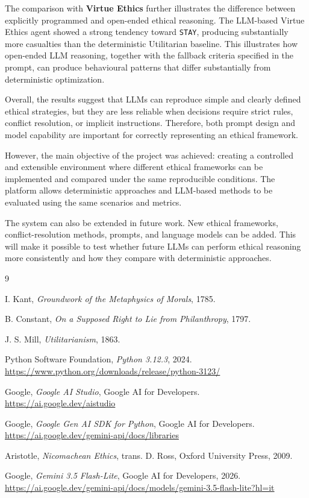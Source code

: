 \documentclass[10pt,a4paper]{article}
\begin{document}
The comparison with \textbf{Virtue Ethics} further illustrates the difference between
explicitly programmed and open-ended ethical reasoning. The LLM-based Virtue
Ethics agent showed a strong tendency toward \texttt{STAY}, producing
substantially more casualties than the deterministic Utilitarian baseline.
This illustrates how open-ended LLM reasoning, together with the fallback
criteria specified in the prompt, can produce behavioural patterns that differ
substantially from deterministic optimization.

Overall, the results suggest that LLMs can reproduce simple and clearly defined ethical strategies, but they are less reliable when decisions require strict rules, conflict resolution, or implicit instructions. Therefore, both prompt design and model capability are important for correctly representing an ethical framework.

However, the main objective of the project was achieved: creating a controlled and extensible environment where different ethical frameworks can be implemented and compared under the same reproducible conditions. The platform allows deterministic approaches and LLM-based methods to be evaluated using the same scenarios and metrics.

The system can also be extended in future work. New ethical frameworks, conflict-resolution methods, prompts, and language models can be added. This will make it possible to test whether future LLMs can perform ethical reasoning more consistently and how they compare with deterministic approaches.





\newpage
\begin{thebibliography}{9}

I. Kant,
\textit{Groundwork of the Metaphysics of Morals},
1785.

B. Constant,
\textit{On a Supposed Right to Lie from Philanthropy},
1797.

J. S. Mill,
\textit{Utilitarianism},
1863.

Python Software Foundation,
\textit{Python 3.12.3},
2024.
\url{https://www.python.org/downloads/release/python-3123/}

Google,
\textit{Google AI Studio},
Google AI for Developers.
\url{https://ai.google.dev/aistudio}

Google,
\textit{Google Gen AI SDK for Python},
Google AI for Developers.
\url{https://ai.google.dev/gemini-api/docs/libraries}

Aristotle,
\textit{Nicomachean Ethics},
trans. D. Ross, Oxford University Press, 2009.

Google,
\textit{Gemini 3.5 Flash-Lite},
Google AI for Developers, 2026.
\url{https://ai.google.dev/gemini-api/docs/models/gemini-3.5-flash-lite?hl=it}

\end{thebibliography}
\end{document}

